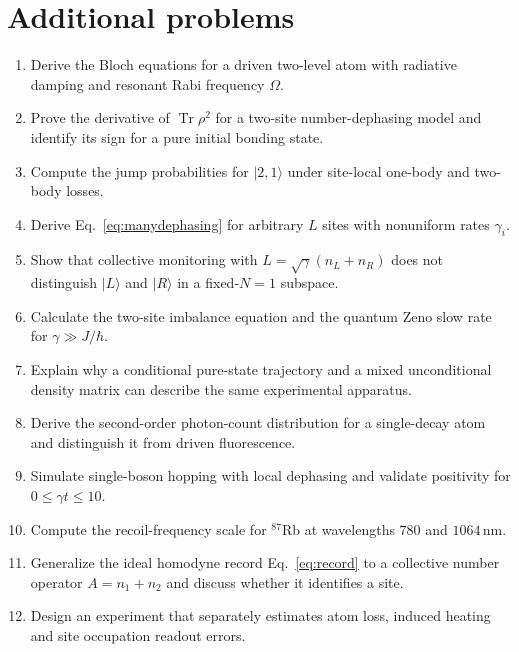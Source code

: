 \documentclass[11pt,a4paper]{article}
\newcommand{\tr}{\operatorname{Tr}}\newcommand{\D}{\mathcal D}\newcommand{\kb}{k_{\mathrm B}}\newcommand{\E}{\mathbb E}\newcommand{\Ha}{\mathcal H}\newcommand{\ket}[1]{|#1\rangle}\newcommand{\bra}[1]{\langle#1|}
\begin{document}
\section{Additional problems}
\begin{enumerate}[label=\textbf{P\arabic*.},leftmargin=*]
\item Derive the Bloch equations for a driven two-level atom with radiative damping and resonant Rabi frequency $\Omega$.
\item Prove the derivative of $\tr\rho^2$ for a two-site number-dephasing model and identify its sign for a pure initial bonding state.
\item Compute the jump probabilities for $\ket{2,1}$ under site-local one-body and two-body losses.
\item Derive Eq.~\eqref{eq:manydephasing} for arbitrary $L$ sites with nonuniform rates $\gamma_i$.
\item Show that collective monitoring with $L=\sqrt\gamma(n_L+n_R)$ does not distinguish $\ket L$ and $\ket R$ in a fixed-$N=1$ subspace.
\item Calculate the two-site imbalance equation and the quantum Zeno slow rate for $\gamma\gg J/\hbar$.
\item Explain why a conditional pure-state trajectory and a mixed unconditional density matrix can describe the same experimental apparatus.
\item Derive the second-order photon-count distribution for a single-decay atom and distinguish it from driven fluorescence.
\item Simulate single-boson hopping with local dephasing and validate positivity for $0\le\gamma t\le10$.
\item Compute the recoil-frequency scale for $^{87}$Rb at wavelengths $780$ and $1064\,$nm.
\item Generalize the ideal homodyne record Eq.~\eqref{eq:record} to a collective number operator $A=n_1+n_2$ and discuss whether it identifies a site.
\item Design an experiment that separately estimates atom loss, induced heating and site occupation readout errors.
\end{enumerate}
\end{document}
